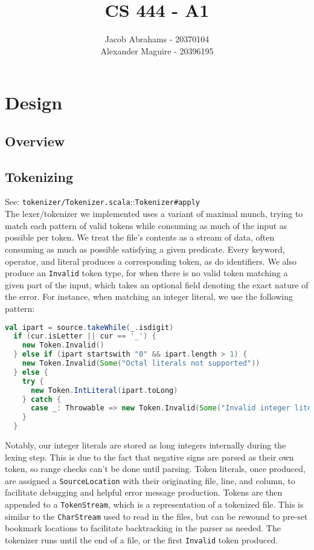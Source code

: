 \documentclass{article}
\title{CS 444 - A1}
\author{Jacob Abrahams - 20370104\\ Alexander Maguire - 20396195}
\begin{document}
\newcommand\type[1]{\texttt{#1}}
\newcommand\func[1]{\texttt{#1}}
\renewcommand\value[1]{\texttt{#1}}
\newcommand\source[2]{See: \texttt{#1.scala}::\type{#2} \\}

\maketitle

\section{Design}


\subsection{Overview}


\subsection{Tokenizing}
\source{tokenizer/Tokenizer}{Tokenizer\#apply}
The lexer/tokenizer we implemented uses a variant of maximal munch, trying to match each pattern of valid tokens while consuming as much of the input as possible per token. We treat the file's contents as a stream of data, often consuming as much as possible satisfying a given predicate. Every keyword, operator, and literal produces a corresponding token, as do identifiers. We also produce an {\tt Invalid} token type, for when there is no valid token matching a given part of the input, which takes an optional field denoting the exact nature of the error. For instance, when matching an integer literal, we use the following pattern:
\begin{lstlisting}[language=Scala]
  val ipart = source.takeWhile(_.isdigit)
  if (cur.isLetter || cur == '_') {
    new Token.Invalid()
  } else if (ipart startswith "0" && ipart.length > 1) {
    new Token.Invalid(Some("Octal literals not supported"))
  } else {
    try {
      new Token.IntLiteral(ipart.toLong)
    } catch {
      case _: Throwable => new Token.Invalid(Some("Invalid integer literal "+ ipart))
    }
  }
\end{lstlisting}

Notably, our integer literals are stored as long integers internally during the lexing step. This is due to the fact that negative signs are parsed as their own token, so range checks can't be done until parsing. Token literals, once produced, are assigned a {\tt SourceLocation} with their originating file, line, and column, to facilitate debugging and helpful error message production. Tokens are then appended to a {\tt TokenStream}, which is a representation of a tokenized file. This is similar to the {\tt CharStream} used to read in the files, but can be rewound to pre-set bookmark locations to facilitate backtracking in the parser as needed. The tokenizer runs until the end of a file, or the first {\tt Invalid} token produced.
\end{document}
